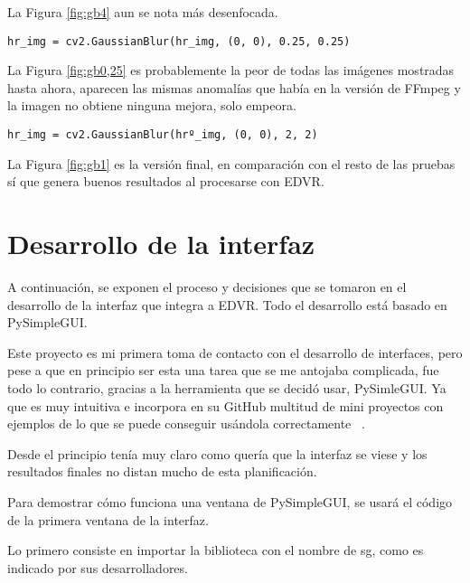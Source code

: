     La Figura \ref{fig:gb4} aun se nota más desenfocada.
    
     \texttt{hr\_img = cv2.GaussianBlur(hr\_img, (0, 0), 0.25, 0.25)}

    
    La Figura \ref{fig:gb0,25} es probablemente la peor de todas las imágenes mostradas hasta ahora, aparecen las mismas anomalías que había en la versión de FFmpeg y la imagen no obtiene ninguna mejora, solo empeora.  
    
     \texttt{hr\_img = cv2.GaussianBlur(hrº\_img, (0, 0), 2, 2)}

    
    La Figura \ref{fig:gb1} es la versión final, en comparación con el resto de las pruebas sí que genera buenos resultados al procesarse con EDVR.
    
    
\section{Desarrollo de la interfaz}   

    A continuación, se exponen el proceso y decisiones que se tomaron en el desarrollo de la interfaz que integra a EDVR. Todo el desarrollo está basado en PySimpleGUI.
    
    Este proyecto es mi primera toma de contacto con el desarrollo de interfaces, pero pese a que en principio ser esta una tarea que se me antojaba complicada, fue todo lo contrario, gracias a la herramienta que se decidó usar, PySimleGUI.  Ya que es muy intuitiva e incorpora en su GitHub multitud de mini proyectos con ejemplos de lo que se puede conseguir usándola correctamente ~\cite{PySimpleGUI}.
    
    Desde el principio tenía muy claro como quería que la interfaz se viese y los resultados finales no distan mucho de esta planificación.
    
    \label{todo}
     
    Para demostrar cómo funciona una ventana de PySimpleGUI, se usará el código de la primera ventana de la interfaz.
    
    Lo primero consiste en importar la biblioteca con el nombre de sg, como es indicado por sus desarrolladores. 
    
